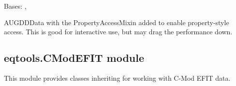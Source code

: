 \documentclass[letterpaper,10pt,english]{sphinxmanual}
\begin{document}

\begin{fulllineitems}
\label{\detokenize{eqtools:eqtools.AUGData.AUGDDDataProp}}
Bases: {\hyperref[\detokenize{eqtools:eqtools.AUGData.AUGDDData}]{}}, {\hyperref[\detokenize{eqtools:eqtools.core.PropertyAccessMixin}]{}}

AUGDDData with the PropertyAccessMixin added to enable property-style
access. This is good for interactive use, but may drag the performance down.

\end{fulllineitems}



\subsection{eqtools.CModEFIT module}
\label{\detokenize{eqtools:module-eqtools.CModEFIT}}\label{\detokenize{eqtools:eqtools-cmodefit-module}}
This module provides classes inheriting {\hyperref[\detokenize{eqtools:eqtools.EFIT.EFITTree}]{}} for
working with C-Mod EFIT data.
\end{document}
